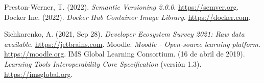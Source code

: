 \begin{thebibliography}{99}
     Preston-Werner, T. (2022). \textit{Semantic Versioning 2.0.0}. \href{https://semver.org}{https://semver.org}.
     Docker Inc. (2022). \textit{Docker Hub Container Image Library}. \href{https://hub.docker.com}{https://docker.com}.

     Sichkarenko, A. (2021, Sep 28). \textit{Developer Ecosystem Survey 2021: Raw data available}. \href{https://blog.jetbrains.com/blog/2021/09/28/developer-ecosystem-survey-2021-raw-data-available/}{https://jetbrains.com}.
     Moodle. \textit{Moodle - Open-source learning platform}. \href{https://moodle.org}{https://moodle.org}.
     IMS Global Learning Consortium. (16 de abril de 2019). \textit{Learning Tools Interoperability Core Specification} (versión 1.3). \href{https://www.imsglobal.org/spec/lti/v1p3}{https://imsglobal.org}.
\end{thebibliography}


